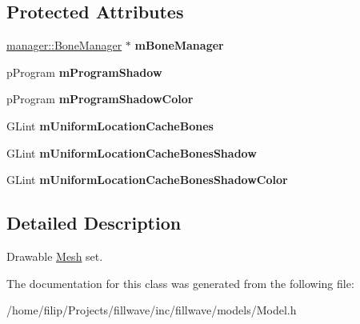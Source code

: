 \subsection*{Protected Attributes}
\begin{DoxyCompactItemize}
\item 
\hypertarget{classfillwave_1_1models_1_1Model_aceb3b31dc49c147f290e703c08778627}{}\hyperlink{classfillwave_1_1manager_1_1BoneManager}{manager\+::\+Bone\+Manager} $\ast$ {\bfseries m\+Bone\+Manager}\label{classfillwave_1_1models_1_1Model_aceb3b31dc49c147f290e703c08778627}

\item 
\hypertarget{classfillwave_1_1models_1_1Model_ae7620f5540fc9f44474a7309febdd7fd}{}p\+Program {\bfseries m\+Program\+Shadow}\label{classfillwave_1_1models_1_1Model_ae7620f5540fc9f44474a7309febdd7fd}

\item 
\hypertarget{classfillwave_1_1models_1_1Model_ac1f6861cdf76ae7cd9fb87bc3c306f50}{}p\+Program {\bfseries m\+Program\+Shadow\+Color}\label{classfillwave_1_1models_1_1Model_ac1f6861cdf76ae7cd9fb87bc3c306f50}

\item 
\hypertarget{classfillwave_1_1models_1_1Model_af4e1583c66011ec32e8b4d9bffe62e4f}{}G\+Lint {\bfseries m\+Uniform\+Location\+Cache\+Bones}\label{classfillwave_1_1models_1_1Model_af4e1583c66011ec32e8b4d9bffe62e4f}

\item 
\hypertarget{classfillwave_1_1models_1_1Model_aa30e51157265b3520108dd659e63520e}{}G\+Lint {\bfseries m\+Uniform\+Location\+Cache\+Bones\+Shadow}\label{classfillwave_1_1models_1_1Model_aa30e51157265b3520108dd659e63520e}

\item 
\hypertarget{classfillwave_1_1models_1_1Model_a865e04f17029cab4f3a4175fce30be7a}{}G\+Lint {\bfseries m\+Uniform\+Location\+Cache\+Bones\+Shadow\+Color}\label{classfillwave_1_1models_1_1Model_a865e04f17029cab4f3a4175fce30be7a}

\end{DoxyCompactItemize}


\subsection{Detailed Description}
Drawable \hyperlink{classfillwave_1_1models_1_1Mesh}{Mesh} set. 

The documentation for this class was generated from the following file\+:\begin{DoxyCompactItemize}
\item 
/home/filip/\+Projects/fillwave/inc/fillwave/models/Model.\+h\end{DoxyCompactItemize}
